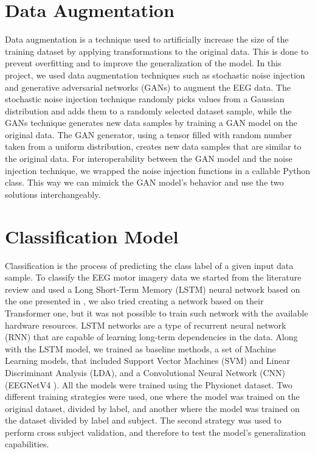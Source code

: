 \section{Data Augmentation}
Data augmentation is a technique used to artificially increase the size of the training dataset by applying transformations to the original data.
This is done to prevent overfitting and to improve the generalization of the model.
In this project, we used data augmentation techniques such as stochastic noise injection and generative adversarial networks (GANs) to augment the EEG data.
The stochastic noise injection technique randomly picks values from a Gaussian distribution and adds them to a randomly selected dataset sample, while the GANs technique generates new data samples by training a GAN model on the original data.
The GAN generator, using a tensor filled with random number taken from a uniform distribution, creates new data samples that are similar to the original data.
For interoperability between the GAN model and the noise injection technique, we wrapped the noise injection functions in a callable Python class.
This way we can mimick the GAN model's behavior and use the two solutions interchangeably.


\section{Classification Model}
Classification is the process of predicting the class label of a given input data sample.
To classify the EEG motor imagery data we started from the literature review and used a Long Short-Term Memory (LSTM) neural network based on the one presented in \cite{sharma_deep_2023}, we also tried creating a network based on their Transformer one, but it was not possible to train such network with the available hardware resources.
LSTM networks are a type of recurrent neural network (RNN) that are capable of learning long-term dependencies in the data.
Along with the LSTM model, we trained as baseline methods, a set of Machine Learning models, that included Support Vector Machines (SVM) and Linear Discriminant Analysis (LDA), and a Convolutional Neural Network (CNN) (EEGNetV4 \cite{lawhern2018eegnet}).
All the models were trained using the Physionet dataset. 
Two different training strategies were used, one where the model was trained on the original dataset, divided by label, and another where the model was trained on the dataset divided by label and subject.
The second strategy was used to perform cross subject validation, and therefore to test the model's generalization capabilities.

